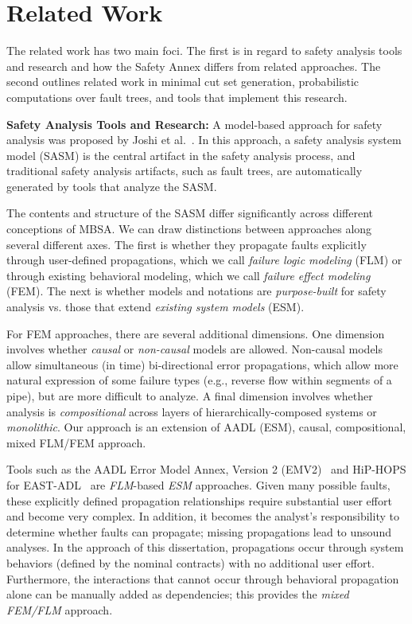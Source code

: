 \section{Related Work}
The related work has two main foci. The first is in regard to safety analysis tools and research and how the Safety Annex differs from related approaches. The second outlines related work in minimal cut set generation, probabilistic computations over fault trees, and tools that implement this research. 

\textbf{Safety Analysis Tools and Research:}
A model-based approach for safety analysis was proposed by Joshi et al.~\cite{Joshi05:Dasc, Joshi05:SafeComp, Joshi07:Hase}.  In this approach, a safety analysis system model (SASM) is the central artifact in the safety analysis process, and traditional safety analysis artifacts, such as fault trees, are automatically generated by tools that analyze the SASM.

The contents and structure of the SASM differ significantly across different conceptions of MBSA.  We can draw distinctions between approaches along several different axes.  The first is whether they propagate faults explicitly through user-defined propagations, which we call {\em failure logic modeling} (FLM) or through existing behavioral modeling, which we call {\em failure effect modeling} (FEM).  The next is whether models and notations are {\em purpose-built} for safety analysis vs. those that extend {\em existing system models} (ESM).

For FEM approaches, there are several additional dimensions.  One dimension involves whether {\em causal} or {\em non-causal} models are allowed.  Non-causal models allow simultaneous (in time) bi-directional %
error propagations, which allow more natural expression of some failure types (e.g., reverse flow within segments of a pipe), but are more difficult to analyze.  A final dimension involves whether analysis is {\em compositional} across layers of hierarchically-composed systems or {\em monolithic}.  Our approach is an extension of AADL (ESM), causal, compositional, mixed FLM/FEM approach.

Tools such as the AADL Error Model Annex, Version 2 (EMV2)~\cite{EMV2} and HiP-HOPS for EAST-ADL~\cite{CHEN201391} are {\em FLM}-based {\em ESM} approaches.  Given many possible faults, these explicitly defined propagation relationships require substantial user effort and become very complex.  In addition, it becomes the analyst's responsibility to determine whether faults can propagate; missing propagations lead to unsound analyses.  In the approach of this dissertation, propagations occur through system behaviors (defined by the nominal contracts) with no additional user effort. Furthermore, the interactions that cannot occur through behavioral propagation alone can be manually added as dependencies; this provides the \textit{mixed FEM/FLM} approach.

